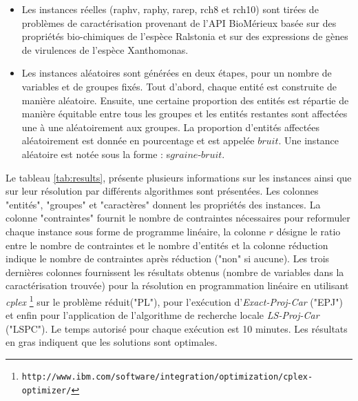 \documentclass[a4paper,10pt]{article}
\begin{document}
\begin{itemize}
\item Les instances réelles (raphv, raphy, rarep, rch8 et rch10) sont tirées de problèmes de caractérisation provenant de l'API BioMérieux basée sur des propriétés bio-chimiques de l'espèce Ralstonia et sur des expressions de gènes de virulences de l'espèce Xanthomonas.
\item Les instances aléatoires sont générées en deux étapes, pour un nombre de variables et de groupes fixés. Tout d'abord, chaque entité est construite de manière aléatoire. Ensuite, une certaine proportion des
entités est répartie de manière équitable entre tous les groupes et les entités
restantes sont affectées une à une aléatoirement aux groupes. La proportion
d'entités affectées aléatoirement est donnée en pourcentage et est appelée
$bruit$. Une instance aléatoire est notée sous la forme : s$graine$-$bruit$.
\end{itemize}

Le tableau \ref{tab:results}, présente plusieurs informations sur les instances ainsi que sur leur résolution par différents algorithmes sont présentées. Les colonnes "entités", "groupes" et "caractères" donnent les propriétés des instances. La colonne "contraintes" fournit le nombre de contraintes nécessaires pour reformuler chaque instance sous forme de programme linéaire, la colonne $r$ désigne le ratio entre le nombre de contraintes et le nombre d'entités et la colonne réduction indique le nombre de contraintes après réduction ("non" si aucune). Les trois dernières colonnes fournissent les résultats obtenus (nombre de variables dans la caractérisation trouvée) pour la résolution en programmation linéaire en utilisant \emph{cplex}  \footnote{\texttt{http://www.ibm.com/software/integration/optimization/cplex-optimizer/}} sur le problème réduit("PL"), pour l'exécution d'\emph{Exact-Proj-Car} ("EPJ") et enfin pour l'application de l'algorithme de recherche locale \emph{LS-Proj-Car} ("LSPC"). Le temps
autorisé pour chaque exécution est 10 minutes.
Les résultats en gras indiquent que les solutions sont optimales.
\end{document}
